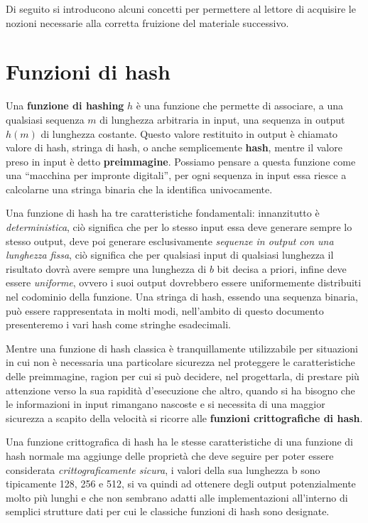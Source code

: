 Di seguito si introducono alcuni concetti 
per permettere al lettore di acquisire le nozioni necessarie alla
corretta fruizione del materiale successivo.

\section{Funzioni di hash}
\label{sub:hash}
Una \textbf{funzione di hashing} \(h\) è una funzione che permette di associare,
a una qualsiasi sequenza \(m\) di lunghezza arbitraria in input, una sequenza
in output \(h(m)\) di lunghezza costante. 
Questo valore restituito in output è chiamato valore di hash, stringa di hash,
o anche semplicemente \textbf{hash}, mentre il valore preso in input è detto
\textbf{preimmagine}. Possiamo pensare a questa funzione come una “macchina per
impronte digitali”, per ogni sequenza in input essa riesce a calcolarne una stringa binaria
che la identifica univocamente.

Una funzione di hash ha tre caratteristiche fondamentali:
innanzitutto è \emph{deterministica}, ciò significa che per lo stesso input essa deve
generare sempre lo stesso output, deve poi generare esclusivamente
\emph{sequenze in output con una lunghezza fissa}, ciò significa che per qualsiasi input
di qualsiasi lunghezza il risultato dovrà avere sempre una lunghezza di \(b\) bit decisa
a priori, infine deve essere \emph{uniforme}, ovvero i suoi output dovrebbero essere
uniformemente distribuiti nel codominio della funzione.
Una stringa di hash, essendo una sequenza binaria, può essere rappresentata in molti modi,
nell'ambito di questo documento presenteremo i vari hash come stringhe esadecimali.

Mentre una funzione di hash classica è tranquillamente utilizzabile per situazioni
in cui non è necessaria una particolare sicurezza nel proteggere le caratteristiche
delle preimmagine, ragion per cui si può decidere, nel progettarla, di prestare più
attenzione verso la sua rapidità d'esecuzione che altro, quando si ha bisogno che le
informazioni in input rimangano nascoste e si necessita di una maggior sicurezza a scapito
della velocità si ricorre alle \textbf{funzioni crittografiche di hash}.

Una funzione crittografica di hash ha le stesse caratteristiche di una funzione di
hash normale ma aggiunge delle proprietà che deve seguire per poter essere considerata
\emph{crittograficamente sicura}, i valori della sua lunghezza b sono tipicamente
128, 256 e 512, si va quindi ad ottenere degli output potenzialmente molto più lunghi
e che non sembrano adatti alle implementazioni all'interno di semplici strutture dati
per cui le classiche funzioni di hash sono designate.

